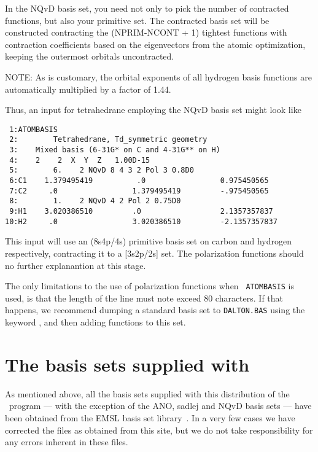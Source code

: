 In the NQvD basis set, you need not only to pick the number of
contracted functions, but also your primitive set. The contracted
basis set will be constructed contracting the (NPRIM-NCONT + 1)
tightest functions with contraction coefficients based on the
eigenvectors from the atomic optimization, keeping the outermost
orbitals uncontracted.

NOTE: As is customary, the orbital exponents of all hydrogen basis
functions are automatically multiplied by a factor of 1.44.

Thus, an input for tetrahedrane employing the NQvD basis set might
look like

\begin{verbatim}
 1:ATOMBASIS
 2:        Tetrahedrane, Td_symmetric geometry
 3:    Mixed basis (6-31G* on C and 4-31G** on H)
 4:    2    2  X  Y  Z   1.00D-15
 5:        6.    2 NQvD 8 4 3 2 Pol 3 0.8D0
 6:C1    1.379495419          .0                 0.975450565  
 7:C2     .0                 1.379495419         -.975450565  
 8:        1.    2 NQvD 4 2 Pol 2 0.75D0
 9:H1    3.020386510         .0                  2.1357357837 
10:H2     .0                 3.020386510         -2.1357357837
\end{verbatim}

This input will use an (8s4p/4s) primitive basis set on carbon and
hydrogen respectively, contracting it to a [3s2p/2s] set. The
polarization functions should no further explanantion at this stage. 

The only limitations to the use of polarization functions when {\tt
ATOMBASIS} is used, is that the length of the line must note exceed 80
characters. If that happens, we recommend dumping a standard basis set
to \verb|DALTON.BAS| using the keyword , and then adding
functions to this set.

\section{The basis sets supplied with \siraba }

As mentioned above, all the basis sets supplied with this distribution
of the \siraba\ program --- with the exception of the ANO,
sadlej and NQvD basis sets --- have been obtained from the EMSL basis set
library~\cite{emslref}. In a very few cases we have corrected the
files as obtained from this site, but we do not take responsibility
for any errors inherent in these files.


